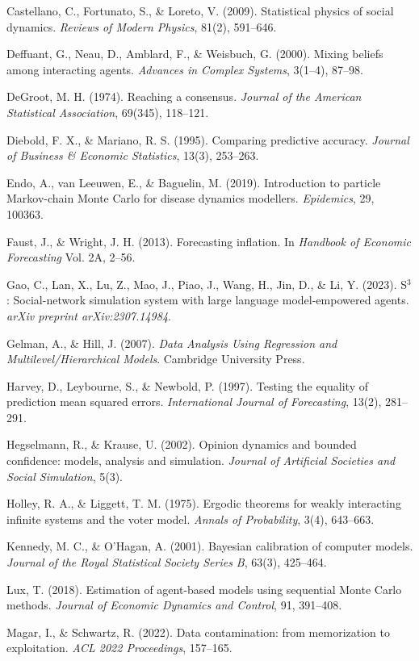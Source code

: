 \documentclass[
]{article}
\begin{document}
Castellano, C., Fortunato, S., \& Loreto, V. (2009). Statistical physics
of social dynamics. \emph{Reviews of Modern Physics}, 81(2), 591--646.

Deffuant, G., Neau, D., Amblard, F., \& Weisbuch, G. (2000). Mixing
beliefs among interacting agents. \emph{Advances in Complex Systems},
3(1--4), 87--98.

DeGroot, M. H. (1974). Reaching a consensus. \emph{Journal of the
American Statistical Association}, 69(345), 118--121.

Diebold, F. X., \& Mariano, R. S. (1995). Comparing predictive accuracy.
\emph{Journal of Business \& Economic Statistics}, 13(3), 253--263.

Endo, A., van Leeuwen, E., \& Baguelin, M. (2019). Introduction to
particle Markov-chain Monte Carlo for disease dynamics modellers.
\emph{Epidemics}, 29, 100363.

Faust, J., \& Wright, J. H. (2013). Forecasting inflation. In
\emph{Handbook of Economic Forecasting} Vol. 2A, 2--56.

Gao, C., Lan, X., Lu, Z., Mao, J., Piao, J., Wang, H., Jin, D., \& Li,
Y. (2023). S\(^3\): Social-network simulation system with large language
model-empowered agents. \emph{arXiv preprint arXiv:2307.14984}.

Gelman, A., \& Hill, J. (2007). \emph{Data Analysis Using Regression and
Multilevel/Hierarchical Models}. Cambridge University Press.

Harvey, D., Leybourne, S., \& Newbold, P. (1997). Testing the equality
of prediction mean squared errors. \emph{International Journal of
Forecasting}, 13(2), 281--291.

Hegselmann, R., \& Krause, U. (2002). Opinion dynamics and bounded
confidence: models, analysis and simulation. \emph{Journal of Artificial
Societies and Social Simulation}, 5(3).

Holley, R. A., \& Liggett, T. M. (1975). Ergodic theorems for weakly
interacting infinite systems and the voter model. \emph{Annals of
Probability}, 3(4), 643--663.

Kennedy, M. C., \& O'Hagan, A. (2001). Bayesian calibration of computer
models. \emph{Journal of the Royal Statistical Society Series B}, 63(3),
425--464.

Lux, T. (2018). Estimation of agent-based models using sequential Monte
Carlo methods. \emph{Journal of Economic Dynamics and Control}, 91,
391--408.

Magar, I., \& Schwartz, R. (2022). Data contamination: from memorization
to exploitation. \emph{ACL 2022 Proceedings}, 157--165.
\end{document}
